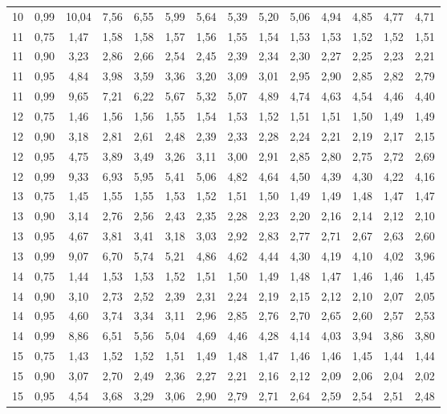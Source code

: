 \documentclass[
]{article}
\begin{document}
\begin{landscape}
\begin{longtable}[t]{cccccccccccccc}
10 & 0,99 & 10,04 & 7,56 & 6,55 & 5,99 & 5,64 & 5,39 & 5,20 & 5,06 & 4,94 & 4,85 & 4,77 & 4,71\\
11 & 0,75 & 1,47 & 1,58 & 1,58 & 1,57 & 1,56 & 1,55 & 1,54 & 1,53 & 1,53 & 1,52 & 1,52 & 1,51\\
11 & 0,90 & 3,23 & 2,86 & 2,66 & 2,54 & 2,45 & 2,39 & 2,34 & 2,30 & 2,27 & 2,25 & 2,23 & 2,21\\
11 & 0,95 & 4,84 & 3,98 & 3,59 & 3,36 & 3,20 & 3,09 & 3,01 & 2,95 & 2,90 & 2,85 & 2,82 & 2,79\\
11 & 0,99 & 9,65 & 7,21 & 6,22 & 5,67 & 5,32 & 5,07 & 4,89 & 4,74 & 4,63 & 4,54 & 4,46 & 4,40\\
12 & 0,75 & 1,46 & 1,56 & 1,56 & 1,55 & 1,54 & 1,53 & 1,52 & 1,51 & 1,51 & 1,50 & 1,49 & 1,49\\
12 & 0,90 & 3,18 & 2,81 & 2,61 & 2,48 & 2,39 & 2,33 & 2,28 & 2,24 & 2,21 & 2,19 & 2,17 & 2,15\\
12 & 0,95 & 4,75 & 3,89 & 3,49 & 3,26 & 3,11 & 3,00 & 2,91 & 2,85 & 2,80 & 2,75 & 2,72 & 2,69\\
12 & 0,99 & 9,33 & 6,93 & 5,95 & 5,41 & 5,06 & 4,82 & 4,64 & 4,50 & 4,39 & 4,30 & 4,22 & 4,16\\
13 & 0,75 & 1,45 & 1,55 & 1,55 & 1,53 & 1,52 & 1,51 & 1,50 & 1,49 & 1,49 & 1,48 & 1,47 & 1,47\\
13 & 0,90 & 3,14 & 2,76 & 2,56 & 2,43 & 2,35 & 2,28 & 2,23 & 2,20 & 2,16 & 2,14 & 2,12 & 2,10\\
13 & 0,95 & 4,67 & 3,81 & 3,41 & 3,18 & 3,03 & 2,92 & 2,83 & 2,77 & 2,71 & 2,67 & 2,63 & 2,60\\
13 & 0,99 & 9,07 & 6,70 & 5,74 & 5,21 & 4,86 & 4,62 & 4,44 & 4,30 & 4,19 & 4,10 & 4,02 & 3,96\\
14 & 0,75 & 1,44 & 1,53 & 1,53 & 1,52 & 1,51 & 1,50 & 1,49 & 1,48 & 1,47 & 1,46 & 1,46 & 1,45\\
14 & 0,90 & 3,10 & 2,73 & 2,52 & 2,39 & 2,31 & 2,24 & 2,19 & 2,15 & 2,12 & 2,10 & 2,07 & 2,05\\
14 & 0,95 & 4,60 & 3,74 & 3,34 & 3,11 & 2,96 & 2,85 & 2,76 & 2,70 & 2,65 & 2,60 & 2,57 & 2,53\\
14 & 0,99 & 8,86 & 6,51 & 5,56 & 5,04 & 4,69 & 4,46 & 4,28 & 4,14 & 4,03 & 3,94 & 3,86 & 3,80\\
15 & 0,75 & 1,43 & 1,52 & 1,52 & 1,51 & 1,49 & 1,48 & 1,47 & 1,46 & 1,46 & 1,45 & 1,44 & 1,44\\
15 & 0,90 & 3,07 & 2,70 & 2,49 & 2,36 & 2,27 & 2,21 & 2,16 & 2,12 & 2,09 & 2,06 & 2,04 & 2,02\\
15 & 0,95 & 4,54 & 3,68 & 3,29 & 3,06 & 2,90 & 2,79 & 2,71 & 2,64 & 2,59 & 2,54 & 2,51 & 2,48\\

\end{longtable}
\end{landscape}
\end{document}

